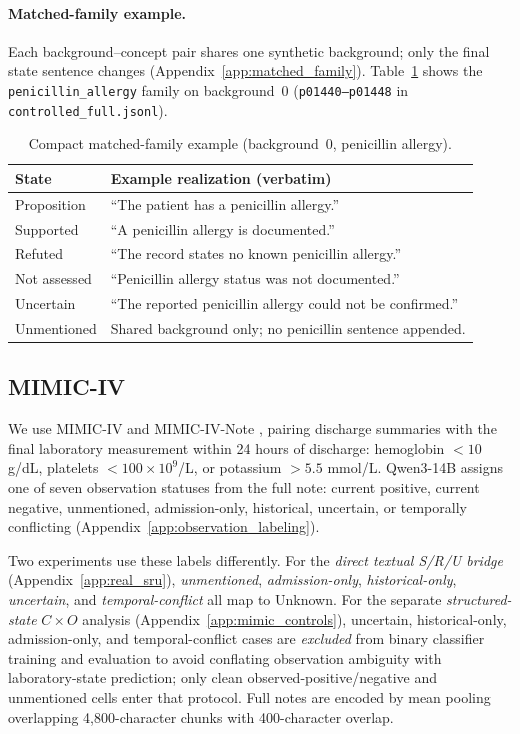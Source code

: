 \documentclass[11pt]{article}
\begin{document}
\paragraph{Matched-family example.}
Each background--concept pair shares one synthetic background; only the final
state sentence changes (Appendix~\ref{app:matched_family}).
Table~\ref{tab:matched_family_compact} shows the \texttt{penicillin\_allergy}
family on background~0 (\texttt{p01440--p01448} in \texttt{controlled\_full.jsonl}).

\begin{table}[t]
  \centering
  \footnotesize
  \renewcommand{\arraystretch}{1.08}
  \caption{Compact matched-family example (background~0, penicillin allergy).}
  \label{tab:matched_family_compact}
  \begin{tabular*}{\columnwidth}{@{\extracolsep{\fill}}lp{}@{}}
    \toprule
    \textbf{State} & \textbf{Example realization (verbatim)} \\
    \midrule
    Proposition & ``The patient has a penicillin allergy.'' \\
    Supported & ``A penicillin allergy is documented.'' \\
    Refuted & ``The record states no known penicillin allergy.'' \\
    Not assessed & ``Penicillin allergy status was not documented.'' \\
    Uncertain & ``The reported penicillin allergy could not be confirmed.'' \\
    Unmentioned & Shared background only; no penicillin sentence appended. \\
    \bottomrule
  \end{tabular*}
\end{table}

\subsection{MIMIC-IV}
We use MIMIC-IV and MIMIC-IV-Note
\citep{johnson-etal-2023-mimiciv,johnson-etal-2023-mimicnote}, pairing discharge
summaries with the final laboratory measurement within 24 hours of discharge: hemoglobin $<10$ g/dL, platelets
$<100\times10^9$/L, or potassium $>5.5$ mmol/L. Qwen3-14B assigns one of seven observation statuses from the full note:
current positive, current negative, unmentioned, admission-only, historical,
uncertain, or temporally conflicting (Appendix~\ref{app:observation_labeling}).

Two experiments use these labels differently.
For the \emph{direct textual S/R/U bridge} (Appendix~\ref{app:real_sru}),
\emph{unmentioned}, \emph{admission-only}, \emph{historical-only},
\emph{uncertain}, and \emph{temporal-conflict} all map to Unknown.
For the separate \emph{structured-state} $C\times O$ analysis
(Appendix~\ref{app:mimic_controls}), uncertain, historical-only,
admission-only, and temporal-conflict cases are \emph{excluded} from binary
classifier training and evaluation to avoid conflating observation ambiguity
with laboratory-state prediction; only clean observed-positive/negative and
unmentioned cells enter that protocol.
Full notes are encoded by mean pooling overlapping 4,800-character chunks with
400-character overlap.
\end{document}
